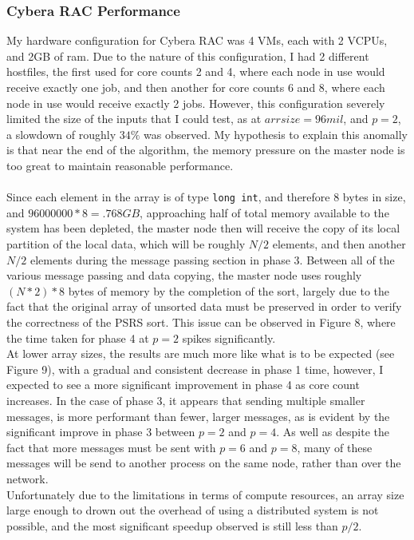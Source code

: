 \documentclass[11pt]{report}
\begin{document}
\subsubsection*{Cybera RAC Performance}
My hardware configuration for Cybera RAC was 4 VMs, each with 2 VCPUs, and 2GB of ram. Due to the nature of this configuration, I had 2 different hostfiles, the first used 
for core counts 2 and 4, where each node in use would receive exactly one job, and then another for core counts 6 and 8, where each node in use would receive exactly 2 jobs.
However, this configuration severely limited the size of the inputs that I could test, as at $arr size=96mil$, and $p=2$, a slowdown of roughly $34\%$ was observed. My
hypothesis to explain this anomally is that near the end of the algorithm, the memory pressure on the master node is too great to maintain reasonable performance.\\\\
Since each element in the array is of type \verb|long int|, and therefore 8 bytes in size, and $96000000* 8 = .768 GB$, approaching half of total memory available to the 
system has been depleted, the master node then will receive the copy of its local partition of the local data, which will be roughly $N/2$ elements, and then another $N/2$
elements during the message passing section in phase 3. Between all of the various message passing and data copying, the master node uses roughly $(N*2) * 8$ bytes of 
memory by the completion of the sort, largely due to the fact that the original array of unsorted data must be preserved in order to verify the correctness of the
PSRS sort. This issue can be observed in Figure 8, where the time taken for phase 4 at $p=2$ spikes significantly.\\
At lower array sizes, the results are much more like what is to be expected (see Figure 9), with a gradual and consistent decrease in phase 1 time, however, I expected to see a more significant improvement in phase 4 as core count increases. In the case of phase 3, it appears that sending multiple smaller
messages, is more performant than fewer, larger messages, as is evident by the significant improve in phase 3 between $p=2$ and $p=4$. As well as despite the fact that more
messages must be sent with $p=6$ and $p=8$, many of these messages will be send to another process on the same node, rather than over the network.\\
Unfortunately due to the limitations in terms of compute resources, an array size large enough to drown out the overhead of using a distributed system is not possible, and the most significant speedup observed is still less than $p/2$.
\end{document}
